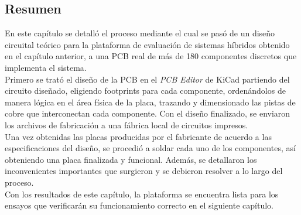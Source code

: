 \subsection{Resumen}

En este capítulo se detalló el proceso mediante el cual se pasó de un diseño circuital teórico para la plataforma de evaluación de sistemas híbridos obtenido en el capítulo anterior, a una PCB real de más de 180 componentes discretos que implementa el sistema.\\

Primero se trató el diseño de la PCB en el \textit{PCB Editor} de KiCad partiendo del circuito diseñado, eligiendo footprints para cada componente, ordenándolos de manera lógica en el área física de la placa, trazando y dimensionado las pistas de cobre que interconectan cada componente. Con el diseño finalizado, se enviaron los archivos de fabricación a una fábrica local de circuitos impresos.\\

Una vez obtenidas las placas producidas por el fabricante de acuerdo a las especificaciones del diseño, se procedió a soldar cada uno de los componentes, así obteniendo una placa finalizada y funcional. Además, se detallaron los inconvenientes importantes que surgieron y se debieron resolver a lo largo del proceso.\\

Con los resultados de este capítulo, la plataforma se encuentra lista para los ensayos que verificarán su funcionamiento correcto en el siguiente capítulo.\\